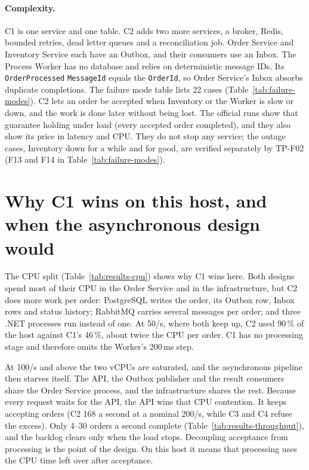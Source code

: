 \documentclass[a4paper]{report}
\begin{document}
\paragraph{Complexity.} C1 is one service and one table. C2 adds two more
services, a broker, Redis, bounded retries, dead letter queues and a
reconciliation job. Order Service and Inventory Service each have an Outbox,
and their consumers use an Inbox. The Process Worker has no database and
relies on deterministic message IDs. Its \texttt{OrderProcessed}
\texttt{MessageId} equals the \texttt{OrderId}, so Order Service's Inbox
absorbs duplicate completions. The failure mode table lists 22 cases
(Table~\ref{tab:failure-modes}). C2 lets an order be accepted when Inventory
or the Worker is slow or down, and the work is done later without being lost.
The official runs show that guarantee holding under load (every accepted order
completed), and they also show its price in latency and CPU. They do not stop
any service; the outage cases, Inventory down for a while and for good, are
verified separately by TP-F02 (F13 and F14 in Table~\ref{tab:failure-modes}).

\section{Why C1 wins on this host, and when the asynchronous design would}
\label{sec:dis-c1-wins}

The CPU split (Table~\ref{tab:results-cpu}) shows why C1 wins here. Both
designs spend most of their CPU in the Order Service and in the
infrastructure, but C2 does more work per order: PostgreSQL writes the order,
its Outbox row, Inbox rows and status history; RabbitMQ carries several
messages per order; and three .NET processes run instead of one. At 50/s,
where both keep up, C2 used 90\,\% of the host against C1's 46\,\%, about
twice the CPU per order. C1 has no processing stage and therefore omits the
Worker's 200\,ms step.

At 100/s and above the two vCPUs are saturated, and the asynchronous pipeline
then starves itself. The API, the Outbox publisher and the result consumers
share the Order Service process, and the infrastructure shares the rest.
Because every request waits for the API, the API wins that CPU contention.
It keeps accepting orders (C2 168 a second at a
nominal 200/s, while C3 and C4 refuse the excess). Only 4--30 orders a second
complete (Table~\ref{tab:results-throughput}), and the backlog clears only
when the load stops. Decoupling acceptance from processing is the point of
the design. On this host it means that processing uses the CPU time left over
after acceptance.
\end{document}

